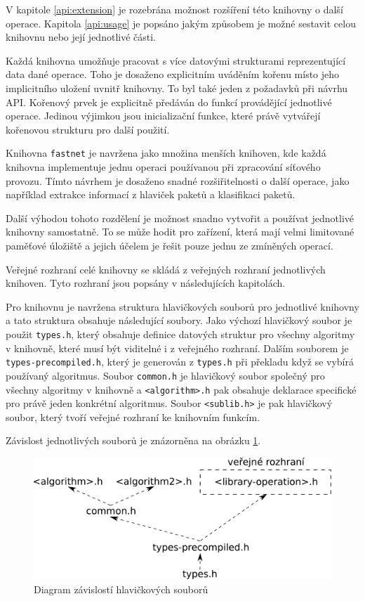 V kapitole \ref{api:extension} je rozebrána možnost rozšíření této knihovny o další operace.
Kapitola \ref{api:usage} je popsáno jakým způsobem je možné sestavit celou knihovnu nebo její jednotlivé
části.

Každá knihovna umožňuje pracovat s více datovými strukturami reprezentující
data dané operace. Toho je dosaženo explicitním uváděním kořenu místo jeho implicitního uložení
uvnitř knihovny. To byl také jeden z požadavků při návrhu API. Kořenový prvek je
explicitně předáván do funkcí provádějící jednotlivé operace. Jedinou výjimkou
jsou inicializační funkce, které právě vytvářejí kořenovou strukturu pro další použití.

Knihovna \texttt{fastnet} je navržena jako množina menších knihoven, kde každá knihovna implementuje
jednu operaci používanou při zpracování síťového provozu.
Tímto návrhem je dosaženo snadné rozšiřitelnosti o další operace,
jako například extrakce informací z hlaviček paketů a klasifikaci paketů.

Další výhodou tohoto rozdělení je možnost snadno vytvořit a používat jednotlivé knihovny samostatně.
To se může hodit pro zařízení, která mají velmi limitované paměťové úložiště a jejich účelem
je řešit pouze jednu ze zmíněných operací.

Veřejné rozhraní celé knihovny se skládá z veřejných rozhraní jednotlivých knihoven.
Tyto rozhraní jsou popsány v následujících kapitolách.

Pro knihovnu je navržena struktura hlavičkových souborů pro jednotlivé knihovny a tato struktura
obsahuje následující soubory. Jako výchozí hlavičkový soubor je použit \texttt{types.h},
který obsahuje definice datových struktur pro všechny algoritmy v knihovně, které musí být
viditelné i z veřejného rozhraní. Dalším souborem je \texttt{types-precompiled.h},
který je generován z \texttt{types.h} při překladu když se vybírá používaný algoritmus.
Soubor \texttt{common.h} je hlavičkový soubor společný pro všechny algoritmy v knihovně a \texttt{<algorithm>.h}
pak obsahuje deklarace specifické pro právě jeden konkrétní algoritmus.
Soubor \texttt{<sublib.h>} je pak hlavičkový soubor, který tvoří veřejné rozhraní ke knihovním funkcím.

Závislost jednotlivých souborů je znázorněna na obrázku \ref{fig:header-dependecies}.

\begin{figure}[!htbp]
    \centering
    \includegraphics[scale=.25]{fig/header-dependencies.pdf}
    \caption{Diagram závislostí hlavičkových souborů}
    \label{fig:header-dependecies}
\end{figure}



